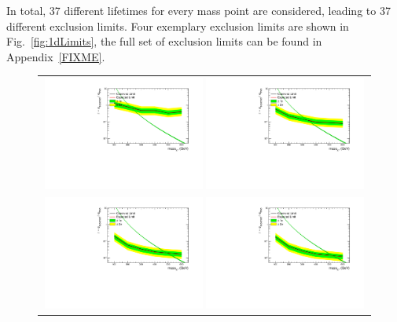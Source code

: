 In total, 37 different lifetimes for every mass point are considered, leading to 37 different exclusion limits.
Four exemplary exclusion limits are shown in Fig.~\ref{fig:1dLimits}, the full set of exclusion limits can be found in Appendix~\ref{FIXME}.

\begin{figure}[!h]
  \centering 
  \begin{tabular}{c}
    \includegraphics[width=0.49\textwidth]{figures/analysis/Interpretation/LimitPlot_ctau5cm.pdf} 
    \includegraphics[width=0.49\textwidth]{figures/analysis/Interpretation/LimitPlot_ctau10cm.pdf} \\
    \includegraphics[width=0.49\textwidth]{figures/analysis/Interpretation/LimitPlot_ctau50cm.pdf} 
    \includegraphics[width=0.49\textwidth]{figures/analysis/Interpretation/LimitPlot_ctau100cm.pdf} 

\end{tabular}
\end{figure}
